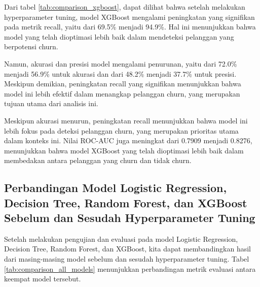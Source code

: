 Dari tabel \ref{tab:comparison_xgboost}, dapat dilihat bahwa setelah melakukan hyperparameter tuning, model XGBoost mengalami peningkatan yang signifikan pada metrik recall, yaitu dari 69.5\% menjadi 94.9\%. Hal ini menunjukkan bahwa model yang telah dioptimasi lebih baik dalam mendeteksi pelanggan yang berpotensi churn.

Namun, akurasi dan presisi model mengalami penurunan, yaitu dari 72.0\% menjadi 56.9\% untuk akurasi dan dari 48.2\% menjadi 37.7\% untuk presisi. Meskipun demikian, peningkatan recall yang signifikan menunjukkan bahwa model ini lebih efektif dalam menangkap pelanggan churn, yang merupakan tujuan utama dari analisis ini.

Meskipun akurasi menurun, peningkatan recall menunjukkan bahwa model ini lebih fokus pada deteksi pelanggan churn, yang merupakan prioritas utama dalam konteks ini. Nilai ROC-AUC juga meningkat dari 0.7909 menjadi 0.8276, menunjukkan bahwa model XGBoost yang telah dioptimasi lebih baik dalam membedakan antara pelanggan yang churn dan tidak churn.

\subsection{Perbandingan Model Logistic Regression, Decision Tree, Random Forest, dan XGBoost Sebelum dan Sesudah Hyperparameter Tuning}
Setelah melakukan pengujian dan evaluasi pada model Logistic Regression, Decision Tree, Random Forest, dan XGBoost, kita dapat membandingkan hasil dari masing-masing model sebelum dan sesudah hyperparameter tuning. Tabel \ref{tab:comparison_all_models} menunjukkan perbandingan metrik evaluasi antara keempat model tersebut.

